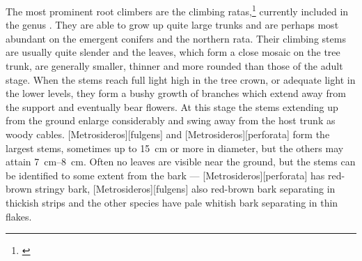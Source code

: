 The most prominent root climbers are the climbing ratas,\footnote{\cite{dawson1967growth}} currently included in the genus .
They are able to grow up quite large trunks and are perhaps most abundant on the emergent conifers and the northern rata.
Their climbing stems are usually quite slender and the leaves, which form a close mosaic on the tree trunk, are generally smaller, thinner and more rounded than those of the adult stage.
When the stems reach full light high in the tree crown, or adequate light in the lower levels, they form a bushy growth of branches which extend away from the support and eventually bear flowers.
At this stage the stems extending up from the ground enlarge considerably and swing away from the host trunk as woody cables. [Metrosideros][fulgens] and [Metrosideros][perforata] form the largest stems, sometimes up to \SI{15}{\centi\metre} or more in diameter, but the others may attain \SIrange{7}{8}{\centi\metre}.
Often no leaves are visible near the ground, but the stems can be identified to some extent from the bark --- [Metrosideros][perforata] has red-brown stringy bark, [Metrosideros][fulgens] also red-brown bark separating in thickish strips and the other species have pale whitish bark separating in thin flakes.

